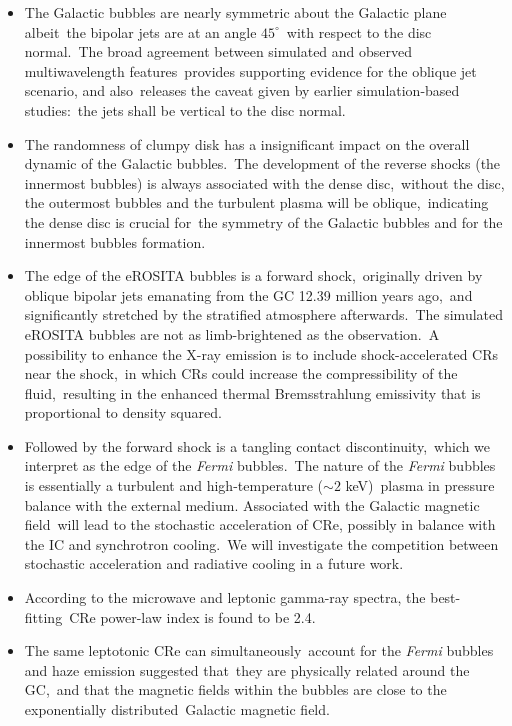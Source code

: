 \documentclass[twocolumn]{aastex631}
\begin{document}
\begin{itemize}

\item The Galactic bubbles are nearly symmetric about the Galactic plane albeit\
      the bipolar jets are at an angle $45^{\circ}$\
      with respect to the disc normal.\
      The broad agreement between simulated and observed multiwavelength features\
      provides supporting evidence for the oblique jet scenario, and also\
      releases the caveat given by earlier simulation-based studies:\
      the jets shall be vertical to the disc normal.
\item The randomness of clumpy disk has a insignificant impact on the overall dynamic of the Galactic bubbles.\
      The development of the reverse shocks (the innermost bubbles) is always associated with the dense disc,\
      without the disc, the outermost bubbles and the turbulent plasma will be oblique,\
      indicating the dense disc is crucial for\
      the symmetry of the Galactic bubbles and for the innermost bubbles formation.
\item The edge of the eROSITA bubbles is a forward shock,\
      originally driven by oblique bipolar jets emanating from the GC 12.39 million years ago,\
      and significantly stretched by the stratified atmosphere afterwards.\
      The simulated eROSITA bubbles are not as limb-brightened as the observation.\
      A possibility to enhance the X-ray emission is to include shock-accelerated CRs near the shock,\
      in which CRs could increase the compressibility of the fluid,\
      resulting in the enhanced thermal Bremsstrahlung emissivity that is proportional to density squared.
\item Followed by the forward shock is a tangling contact discontinuity,\
      which we interpret as the edge of the \textit{Fermi} bubbles.\
      The nature of the \textit{Fermi} bubbles is essentially a turbulent and high-temperature ($\sim2$ keV)\
      plasma in pressure balance with the external medium. Associated with the Galactic magnetic field\
      will lead to the stochastic acceleration of CRe, possibly in balance with the IC and synchrotron cooling.\
      We will investigate the competition between stochastic acceleration and radiative cooling in a future work.
\item According to the microwave and leptonic gamma-ray spectra, the best-fitting\
      CRe power-law index is found to be 2.4.
\item The same leptotonic CRe can simultaneously\
      account for the \textit{Fermi} bubbles and haze emission suggested that\
      they are physically related around the GC,\
      and that the magnetic fields within the bubbles are close to the exponentially distributed\
      Galactic magnetic field.
\end{itemize}
\end{document}
